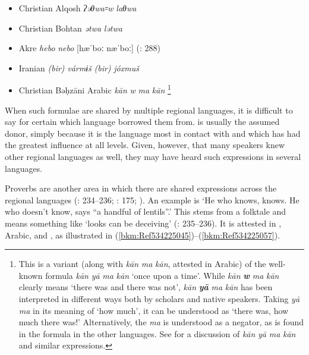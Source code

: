 \documentclass[output=paper]{langsci/langscibook}
\begin{document}
\begin{itemize}[noitemsep]

\item[] Christian Alqosh    \textit{ʔəθwa꞊w} \textit{laθwa} \citep[268]{Coghill2009}

\item[] Christian Bohtan    \textit{ətwa} \textit{lətwa} \citep{Fox2009}

\item[] Akre    \textit{hebo} \textit{nebo} [hæˈboː næˈboː] (\citealt{MacKenzie1962}: 288) 

\item[] Iranian    \textit{(bir)} \textit{vármɨš} \textit{(bir)} \textit{jóxmuš} \citep[175]{Garbell1965}

\item[] {Christian Bəḥzāni Arabic}   \textit{kān} \textit{w} \textit{ma} \textit{kān} \citep[404]{Jastrow1981}\footnote{This is a variant (along with \textit{kān} \textit{ma} \textit{kān}, attested in  Arabic) of the well-known formula \textit{kān} \textit{yā} \textit{ma} \textit{kān} ‘once upon a time’. While \textit{kān} \textbf{\textit{w}} \textit{ma} \textit{kān} clearly means ‘there was and there was not’, \textit{kān} \textbf{\textit{yā}} \textit{ma} \textit{kān} has been interpreted in different ways both by scholars and native speakers. Taking \textit{yā} \textit{ma} in its meaning of ‘how much’, it can be understood as ‘there was, how much there was!’ Alternatively, the \textit{ma} is understood as a negator, as is found in the formula in the other languages. See \citet{Lentin1995} for a discussion of \textit{kān} \textit{yā} \textit{ma} \textit{kān} and similar expressions.}
\end{itemize}

When such formulae are shared by multiple regional languages, it is difficult to say for certain which language  borrowed them from.  is usually the assumed donor, simply because it is the language most in contact with  and which has had the greatest influence at all levels. Given, however, that many speakers knew other regional languages as well, they may have heard such expressions in several languages.

Proverbs are another area in which there are shared expressions across the regional languages (\citealt{Chyet1995}: 234–236; \citealt{Garbell1965}: 175; \citealt{Segal1955}). An example is ‘He who knows, knows. He who doesn’t know, says “a handful of lentils”.’ This stems from a folktale and means something like ‘looks can be deceiving’ (\citealt{Chyet1995}: 235–236). It is attested in ,  Arabic, and , as illustrated in (\ref{bkm:Ref534225045})–(\ref{bkm:Ref534225057}).
\end{document}
